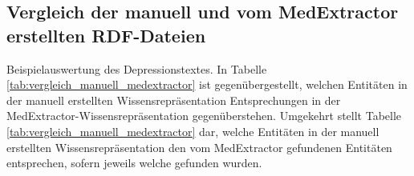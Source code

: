 

\subsection{Vergleich der manuell und vom MedExtractor erstellten RDF-Dateien}
\label{subsec:RDF-Vergleich} 


Beispielauswertung des Depressionstextes. In Tabelle \ref{tab:vergleich_manuell_medextractor} ist gegenübergestellt, welchen Entitäten in der manuell erstellten Wissensrepräsentation Entsprechungen in der MedExtractor-Wissensrepräsentation gegenüberstehen. Umgekehrt stellt Tabelle \ref{tab:vergleich_manuell_medextractor} dar, welche Entitäten in der manuell erstellten Wissensrepräsentation den vom MedExtractor gefundenen Entitäten entsprechen, sofern jeweils welche gefunden wurden.


\lipsum[1-1]

